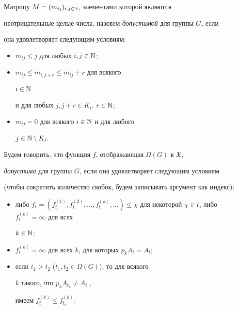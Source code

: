 Матрицу $M=(m_{ij})_{i,j\in\Bbb N}$, элементами которой являются


неотрицательные целые числа, назовем {\em допустимой} для группы $G$, если


она удовлетворяет следующим условиям:


\begin{itemize}


\item[a)] $m_{ij}\leqslant j$ для любых $i,j\in\Bbb N$;


\item[б)]  $m_{ij}\leqslant m_{i,j+r}\leqslant m_{ij}+r$ для всякого


$i\in\Bbb N$


и для любых $j, j+r\in K_i$, $r\in\Bbb N$;


\item[в)] $m_{ij}=0$ для всякого $i\in\Bbb N$ и для любого


$j\in{\Bbb N}\setminus K_i$.


\end{itemize}





Будем говорить, что функция $f$, отображающая $\Omega(G)$ в $\frak X$,


{\em допустима} для группы $G$, если она удовлетворяет следующим условиям


(чтобы сократить количество скобок, будем записывать аргумент как индекс):


\begin{itemize}


\item[1)] либо $f_t=(f_t^{(1)},f_t^{(2)},\dotsc,f_t^{(k)},\dotsc)


\leqslant\chi$ для некоторой $\chi\in t$, либо $f_t^{(k)}=\infty$ для всех


$k\in\Bbb N$;


\item[2)] $f_t^{(k)}=\infty$ для всех $k$, для которых $p_kA_t=A_t$;


\item[3)] если $t_1>t_2$ ($t_1,t_2\in\Omega(G)$), то для всякого


$k$ такого, что $p_kA_{t_1}\ne A_{t_1}$,


имеем $f_{t_1}^{(k)}\leqslant f_{t_2}^{(k)}$.


\end{itemize}





